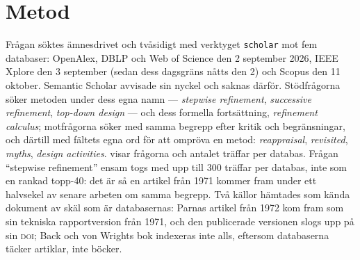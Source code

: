 \section{Metod}
\label{sec:stegvis-metod}

Frågan söktes ämnesdrivet och tvåsidigt med verktyget \texttt{scholar}
mot fem databaser: OpenAlex, DBLP och Web of Science den 2 september
2026, IEEE Xplore den 3 september (sedan dess dagsgräns nåtts den 2) och
Scopus den 11 oktober.  Semantic Scholar avvisade sin nyckel och saknas
därför.  Stödfrågorna söker
metoden under dess egna namn --- \emph{stepwise refinement},
\emph{successive refinement}, \emph{top-down design} --- och dess formella
fortsättning, \emph{refinement calculus}; motfrågorna söker med samma
begrepp efter kritik och begränsningar, och därtill med fältets egna ord
för att ompröva en metod: \emph{reappraisal}, \emph{revisited},
\emph{myths}, \emph{design activities}.   visar
frågorna och antalet träffar per databas.  Frågan \enquote{stepwise
refinement} ensam togs med upp till 300 träffar per databas, inte som en
rankad topp-40: det är
så en artikel från 1971 kommer fram under ett halvsekel av senare
arbeten om samma begrepp.  Två källor hämtades som kända dokument av
skäl som är databasernas: Parnas artikel från 1972\autocite{parnas1972}
kom fram som sin tekniska rapportversion från 1971, och den publicerade
versionen slogs upp på sin \textsc{doi}; Back och von Wrights
bok\autocite{back1998refinement} indexeras inte alls, eftersom
databaserna täcker artiklar, inte böcker.


